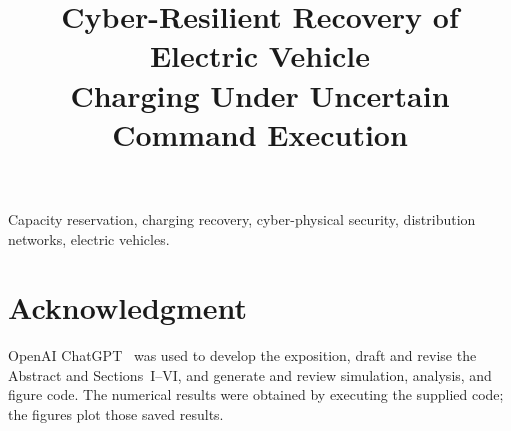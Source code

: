 \documentclass[conference]{IEEEtran}
\begin{document}
\title{Cyber-Resilient Recovery of Electric Vehicle\\Charging Under Uncertain Command Execution}
\author{
}
\maketitle
\begin{abstract}

\end{abstract}
\begin{IEEEkeywords}
Capacity reservation, charging recovery, cyber-physical security,
distribution networks, electric vehicles.
\end{IEEEkeywords}



\section*{Acknowledgment}
OpenAI ChatGPT~\cite{openai2026chatgpt} was used to develop the exposition,
draft and revise the Abstract and Sections~I--VI, and generate and review
simulation, analysis, and figure code. The numerical results were obtained by
executing the supplied code; the figures plot those saved results.


\end{document}

